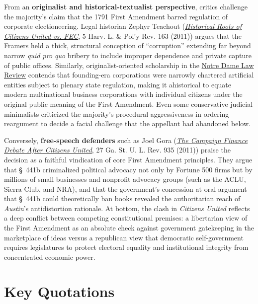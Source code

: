 \documentclass[12pt]{article}
\begin{document}
From an \textbf{originalist and historical-textualist perspective}, critics challenge the majority's claim that the 1791 First Amendment barred regulation of corporate electioneering. Legal historian Zephyr Teachout (\href{https://ir.lawnet.fordham.edu/cgi/viewcontent.cgi?article=1430&context=faculty_scholarship}{\textit{Historical Roots of Citizens United vs. FEC}}, 5 Harv. L. \& Pol'y Rev. 163 (2011)) argues that the Framers held a thick, structural conception of ``corruption'' extending far beyond narrow \textit{quid pro quo} bribery to include improper dependence and private capture of public offices. Similarly, originalist-oriented scholarship in the \href{https://scholarship.law.nd.edu/cgi/viewcontent.cgi?article=4640&context=ndlr}{Notre Dame Law Review} contends that founding-era corporations were narrowly chartered artificial entities subject to plenary state regulation, making it ahistorical to equate modern multinational business corporations with individual citizens under the original public meaning of the First Amendment. Even some conservative judicial minimalists criticized the majority's procedural aggressiveness in ordering reargument to decide a facial challenge that the appellant had abandoned below.

Conversely, \textbf{free-speech defenders} such as Joel Gora (\href{https://readingroom.law.gsu.edu/cgi/viewcontent.cgi?article=2215&context=gsulr}{\textit{The Campaign Finance Debate After Citizens United}}, 27 Ga. St. U. L. Rev. 935 (2011)) praise the decision as a faithful vindication of core First Amendment principles. They argue that \S~441b criminalized political advocacy not only by Fortune 500 firms but by millions of small businesses and nonprofit advocacy groups (such as the ACLU, Sierra Club, and NRA), and that the government's concession at oral argument that \S~441b could theoretically ban books revealed the authoritarian reach of \textit{Austin}'s antidistortion rationale. At bottom, the clash in \textit{Citizens United} reflects a deep conflict between competing constitutional premises: a libertarian view of the First Amendment as an absolute check against government gatekeeping in the marketplace of ideas versus a republican view that democratic self-government requires legislatures to protect electoral equality and institutional integrity from concentrated economic power.

\section{Key Quotations}
\end{document}
